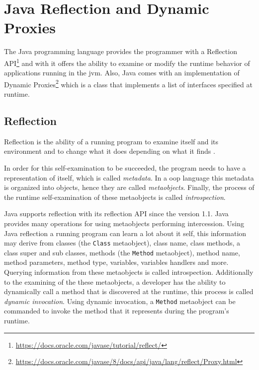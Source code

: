 \section{Java Reflection and Dynamic Proxies}\label{Java Reflection and Dynamic Proxies}
The Java programming language provides the programmer with a Reflection API\footnote{\url{https://docs.oracle.com/javase/tutorial/reflect/}} and with it offers the ability to examine or modify the runtime behavior of applications running in the \ac{jvm}. 
Also, Java comes with an implementation of Dynamic Proxies\footnote{\url{https://docs.oracle.com/javase/8/docs/api/java/lang/reflect/Proxy.html}} which is a class that implements a list of interfaces specified at runtime.

\subsection{Reflection}\label{Reflection}

Reflection is the ability of a running program to examine itself and its environment and to change what it does depending on what it finds \cite{forman2004java}.

In order for this self-examination to be succeeded, the program needs to have a representation of itself, which is called \textit{metadata}.
In a \ac{oop} language this metadata is organized into objects, hence they are called \textit{metaobjects}. 
Finally, the process of the runtime self-examination of these metaobjects is called \textit{introspection}.

Java supports reflection with its reflection API since the version 1.1.
Java provides many operations for using metaobjects performing intercession.
Using Java reflection a running program can learn a lot about it self, this information may derive from classes (the \texttt{Class} metaobject), class name, class methods, a class super and sub classes, methods (the \texttt{Method} metaobject), method name, method parameters, method type, variables, variables handlers and more. 
Querying information from these metaobjects is called introspection.
Additionally to the examining of the these metaobjects, a developer has the ability to dynamically call a method that is discovered at the runtime, this process is called \textit{dynamic invocation}. 
Using dynamic invocation, a \texttt{Method} metaobject can be commanded to invoke the method that it represents during the program's runtime. 

